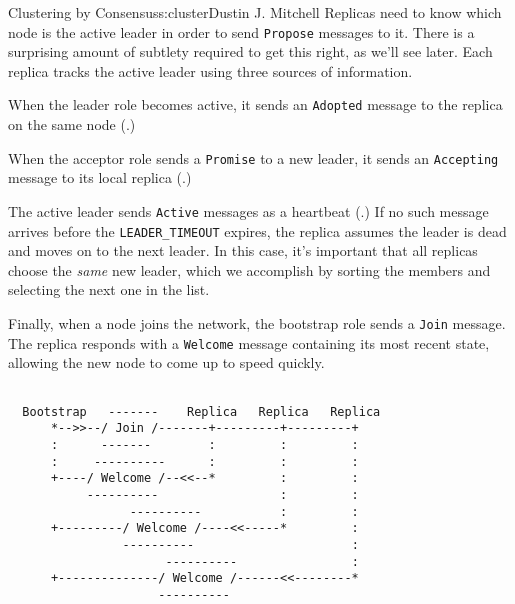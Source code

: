 \begin{aosachapter}{Clustering by Consensus}{s:cluster}{Dustin J. Mitchell}
Replicas need to know which node is the active leader in order to send
\texttt{Propose} messages to it. There is a surprising amount of
subtlety required to get this right, as we'll see later. Each replica
tracks the active leader using three sources of information.

When the leader role becomes active, it sends an \texttt{Adopted}
message to the replica on the same node
(.)


When the acceptor role sends a \texttt{Promise} to a new leader, it
sends an \texttt{Accepting} message to its local replica
(.)


The active leader sends \texttt{Active} messages as a heartbeat
(.) If no such message arrives before
the \texttt{LEADER\_TIMEOUT} expires, the replica assumes the leader is
dead and moves on to the next leader. In this case, it's important that
all replicas choose the \emph{same} new leader, which we accomplish by
sorting the members and selecting the next one in the list.


Finally, when a node joins the network, the bootstrap role sends a
\texttt{Join} message. The replica responds with a \texttt{Welcome}
message containing its most recent state, allowing the new node to come
up to speed quickly.

\begin{verbatim}

  Bootstrap   -------    Replica   Replica   Replica
      *-->>--/ Join /-------+---------+---------+
      :      -------        :         :         :
      :     ----------      :         :         :
      +----/ Welcome /--<<--*         :         :
           ----------                 :         :
                 ----------           :         :
      +---------/ Welcome /----<<-----*         :
                ----------                      :
                      ----------                :
      +--------------/ Welcome /------<<--------*
                     ----------
\end{verbatim}

\begin{verbatim}


\end{verbatim}
\end{aosachapter}
